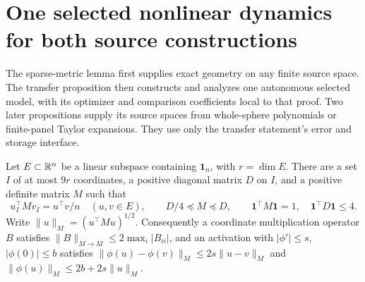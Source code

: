 \section{One selected nonlinear dynamics for both source constructions}
\label{cp:selected-section}

The sparse-metric lemma first supplies exact geometry on any finite source
space. The transfer proposition then constructs and analyzes one autonomous
selected model, with its optimizer and comparison coefficients local to that
proof. Two later propositions supply its source spaces from whole-sphere
polynomials or finite-panel Taylor expansions. They use only the transfer
statement's error and storage interface.

\begin{lemma}
\label{cp:selection}
Let $E\subset\mathbb R^n$ be a linear subspace containing $\mathbf1_n$,
with $r=\dim E$.
There are a set $I$ of at most $9r$ coordinates, a positive diagonal
matrix $D$ on $I$, and a positive definite matrix $M$ such that
\[
 u_I^\top Mv_I=u^\top v/n\quad(u,v\in E),\qquad
 D/4\preceq M\preceq D,\qquad
 \mathbf1^\top M\mathbf1=1,\quad\mathbf1^\top D\mathbf1\le4.
\]
Write $\|u\|_M=(u^\top Mu)^{1/2}$. Consequently a coordinate
multiplication operator $B$ satisfies
$\|B\|_{M\to M}\le2\max_i|B_{ii}|$, and an activation with
$|\phi'|\le s$, $|\phi(0)|\le b$ satisfies
$\|\phi(u)-\phi(v)\|_M\le2s\|u-v\|_M$ and
$\|\phi(u)\|_M\le2b+2s\|u\|_M$.
\end{lemma}
